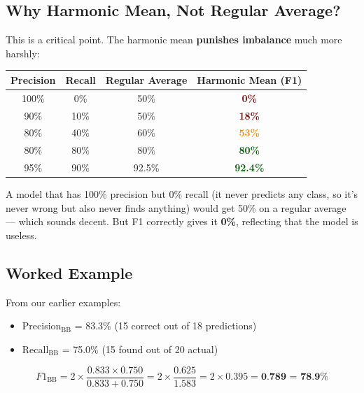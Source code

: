 \documentclass[12pt, a4paper]{article}
\begin{document}
\subsection{Why Harmonic Mean, Not Regular Average?}

This is a critical point. The harmonic mean \textbf{punishes imbalance} much more harshly:

\begin{center}
\begin{tabular}{cccc}
\toprule
\textbf{Precision} & \textbf{Recall} & \textbf{Regular Average} & \textbf{Harmonic Mean (F1)} \\
\midrule
100\% & 0\% & 50\% & \textcolor{darkred}{\textbf{0\%}} \\
90\% & 10\% & 50\% & \textcolor{darkred}{\textbf{18\%}} \\
80\% & 40\% & 60\% & \textcolor{darkorange}{\textbf{53\%}} \\
80\% & 80\% & 80\% & \textcolor{darkgreen}{\textbf{80\%}} \\
95\% & 90\% & 92.5\% & \textcolor{darkgreen}{\textbf{92.4\%}} \\
\bottomrule
\end{tabular}
\end{center}

\begin{intuitionbox}
A model that has 100\% precision but 0\% recall (it never predicts any class, so it's never wrong but also never finds anything) would get 50\% on a regular average --- which sounds decent. But F1 correctly gives it \textbf{0\%}, reflecting that the model is useless.
\end{intuitionbox}

\subsection{Worked Example}

\begin{examplebox}
From our earlier examples:
\begin{itemize}
    \item Precision$_{\text{BB}}$ = 83.3\% (15 correct out of 18 predictions)
    \item Recall$_{\text{BB}}$ = 75.0\% (15 found out of 20 actual)
\end{itemize}

\[
F1_{\text{BB}} = 2 \times \frac{0.833 \times 0.750}{0.833 + 0.750} = 2 \times \frac{0.625}{1.583} = 2 \times 0.395 = \textbf{0.789 = 78.9\%}
\]
\end{examplebox}
\end{document}
